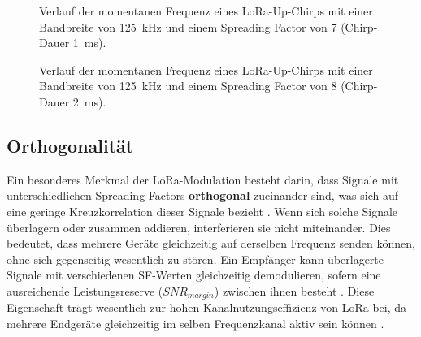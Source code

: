 	\begin{figure}[H]
		\centering
		\caption{Verlauf der momentanen Frequenz eines LoRa-Up-Chirps mit einer Bandbreite von 125~kHz und einem Spreading Factor von 7 (Chirp-Dauer 1~ms).}
	\end{figure}
	
	
	\begin{figure}[H]
		\centering
		\caption{Verlauf der momentanen Frequenz eines LoRa-Up-Chirps mit einer Bandbreite von 125~kHz und einem Spreading Factor von 8 (Chirp-Dauer 2~ms).}
	\end{figure}
	
	\subsection{Orthogonalität \label{lora:orthogonal}}
	Ein besonderes Merkmal der LoRa-Modulation besteht darin, dass Signale mit unterschiedlichen Spreading Factors \textbf{orthogonal} zueinander sind, was sich auf eine geringe Kreuzkorrelation dieser Signale bezieht \cite{Semtech:2015, Semtech:2015b, Vangelista:2017}. Wenn sich solche Signale überlagern oder zusammen addieren, interferieren sie nicht miteinander. Dies bedeutet, dass mehrere Geräte gleichzeitig auf derselben Frequenz senden können, ohne sich gegenseitig wesentlich zu stören. Ein Empfänger kann überlagerte Signale mit verschiedenen SF-Werten gleichzeitig demodulieren, sofern eine ausreichende Leistungsreserve ($SNR_{margin}$) zwischen ihnen besteht \cite{ETSI:2018}. 
	Diese Eigenschaft trägt wesentlich zur hohen Kanalnutzungseffizienz von LoRa bei, da mehrere Endgeräte gleichzeitig im selben Frequenzkanal aktiv sein können \cite{Montagny:2022}.
	
